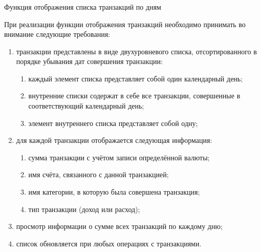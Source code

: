 \subsubsection{} Функция отображения списка транзакций по дням
\label{sec:domain:specification:transactions_list}

При реализации функции отображения транзакций необходимо принимать во внимание следующие требования:

\begin{enumerate}
    \item транзакции представлены в виде двухуровневого списка, отсортированного в порядке убывания дат совершения транзакции:
    \begin{enumerate}
        \item каждый элемент списка представляет собой один календарный день;
        \item внутренние списки содержат в себе все транзакции, совершенные в соответствующий календарный день;
        \item элемент внутреннего списка представляет собой одну;
    \end{enumerate}
    \item для каждой транзакции отображается следующая информация:
    \begin{enumerate}
        \item сумма транзакции с учётом записи определённой валюты;
        \item имя счёта, связанного с данной транзакцией;
        \item имя категории, в которую была совершена транзакция;
        \item тип транзакции (доход или расход);
    \end{enumerate}
    \item просмотр информации о сумме всех транзакций по каждому дню;
    \item список обновляется при любых операциях с транзакциями.
\end{enumerate}
